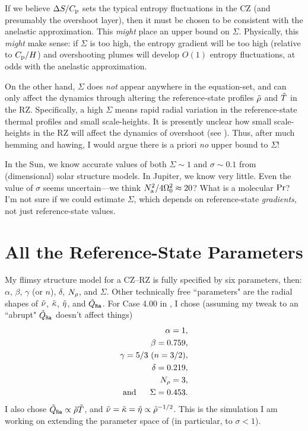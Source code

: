 \documentclass[12pt]{article}
\numberwithin{equation}{section}
\newcommand{\nsqa}{N^2_{\rm a}}
\begin{document}
If we believe $\Delta S/C_{\rm{p}}$ sets the typical entropy fluctuations in the CZ (and presumably the overshoot layer), then it must be chosen to be consistent with the anelastic approximation. This \textit{might} place an upper bound on $\Sigma$. Physically, this \textit{might} make sense: if $\Sigma$ is too high, the entropy gradient will be too high (relative to $C_{\rm{p}}/H$) and overshooting plumes will develop $O(1)$ entropy fluctuations, at odds with the anelastic approximation. 

On the other hand, $\Sigma$ does \textit{not} appear anywhere in the equation-set, and can only affect the dynamics through altering the reference-state profiles $\tilde{\rho}$ and $\tilde{T}$ in the RZ. Specifically, a high $\Sigma$ means rapid radial variation in the reference-state thermal profiles and small scale-heights. It is presently unclear how small scale-heights in the RZ will affect the dynamics of overshoot (see \citealt{Matilsky2024b}). Thus, after much hemming and hawing, I would argue there is a priori \textit{no} upper bound to $\Sigma$! 

In the Sun, we know accurate values of both $\Sigma\sim1$ and $\sigma\sim0.1$ from (dimensional) solar structure models. In Jupiter, we know very little. Even the value of $\sigma$ seems uncertain---we think $\nsqa/4\omnought^2\approx 20$? What is a molecular ${\rm{Pr}}$? I'm not sure if we could estimate $\Sigma$, which depends on reference-state \textit{gradients}, not just reference-state values. 

 \section{All the Reference-State Parameters}
 My flimsy structure model for a CZ--RZ is fully specified by six parameters, then: $\alpha$, $\beta$, $\gamma$ (or $n$), $\delta$, $N_\rho$, and $\Sigma$. Other technically free ``parameters" are the radial shapes of $\tilde{\nu}$, $\tilde{\kappa}$, $\tilde{\eta}$, and $\tilde{Q}_{\texttt{Ra}}$. For Case 4.00 in \citealt{Matilsky2024}, I chose (assuming my tweak to an ``abrupt" $\tilde{Q}_{\texttt{Ra}}$ doesn't affect things)
 \begin{subequations}
 \begin{align}
 	\alpha=1,\\
 	\beta=0.759,\\
 	\gamma =5/3\ (n=3/2),\\
 	\delta = 0.219,\\
 	N_\rho = 3,\\
 	\text{and}\ \ \ \ \ \Sigma = 0.453.
 \end{align}
\end{subequations}
I also chose $\tilde{Q}_{\texttt{Ra}}\propto \tilde{\rho}\tilde{T}$, and $\tilde{\nu}=\tilde{\kappa}=\tilde{\eta}\propto\tilde{\rho}^{-1/2}$. This is the simulation I am working on extending the parameter space of (in particular, to $\sigma<1$). 
\end{document}

